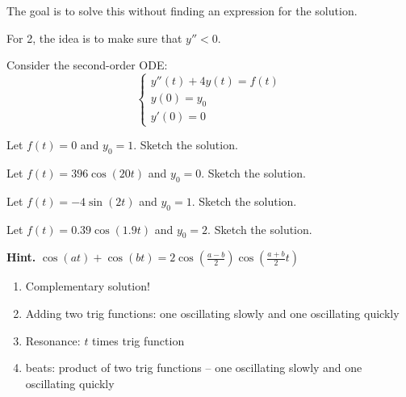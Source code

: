 \begin{annotation}
\begin{goals}
	The goal is to solve this without finding an expression for the solution.
	
	For 2, the idea is to make sure that $y''<0$. 
\end{goals}	
\end{annotation}

	

\bookonlynewpage

\question	
	Consider the second-order ODE:
	$$
	\begin{cases}
	y''(t) +4 y(t) = f(t) \\
	y(0)=y_0\\
	y'(0)=0
	\end{cases}
	$$
	
	\begin{parts}
		\item Let $f(t)=0$ and $y_0=1$. Sketch the solution.
		\item Let $f(t)= 396\cos(20t)$ and $y_0=0$. Sketch the solution.

		\item Let $f(t) = -4\sin(2t)$ and $y_0=1$. Sketch the solution.

		\item Let $f(t) = 0.39\cos(1.9t)$ and $y_0=2$. Sketch the solution.
		
		\textbf{Hint. } $\displaystyle \cos(at) + \cos(bt) = 2 \cos\left( \frac{a-b}{2} \right)  \cos\left(\frac{a+b}{2} t \right)$
	\end{parts}

\begin{annotation}
\begin{goals}
	\begin{enumerate}
		\item Complementary solution!
		\item Adding two trig functions: one oscillating slowly and one oscillating quickly
		\item Resonance: $t$ times trig function
		\item beats: product of two trig functions -- one oscillating slowly and one oscillating quickly
	\end{enumerate}
\end{goals}	
\end{annotation}



